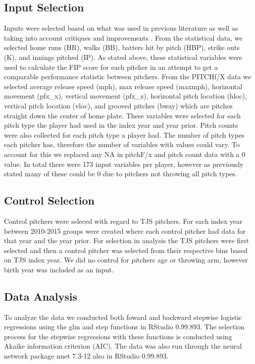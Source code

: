 \subsection{Input Selection}

Inputs were selected based on what was used in previous literature as well as taking into account critiques and improvements \cite{Gray2014}. From the statistical data, we selected home runs (HR), walks (BB), batters hit by pitch (HBP), strike outs (K), and innings pitched (IP). As stated above, these statistical variables were used to calculate the FIP score for each pitcher in an attempt to get a comparable performance statistic between pitchers. From the PITCHf/X data we selected average release speed (mph), max release speed (maxmph), horizontal movement (pfx\_x), vertical movement (pfx\_z), horizontal pitch location (hloc), vertical pitch location (vloc), and grooved pitches (bway) which are pitches straight down the center of home plate. These variables were selected for each pitch type the player had used in the index year and year prior. Pitch counts were also collected for each pitch type a player had. The number of pitch types each pitcher has, therefore the number of variables with values could vary. To account for this we replaced any NA in pitchF/x and pitch count data with a 0 value. In total there were 173 input variables per player, however as previously stated many of these could be 0 due to pitchers not throwing all pitch types.

\subsection{Control Selection}

Control pitchers were seleced with regard to TJS pitchers. For each index year between 2010-2015 groups were created where each control pitcher had data for that year and the year prior. For selection in analysis the TJS pitchers were first selected and then a control pitcher was selected from their respective bins based on TJS index year. We did no control for pitchers age or throwing arm, however birth year was included as an input.

\subsection{Data Analysis}
To analyze the data we conducted both foward and backward stepwise logistic regressions using the glm and step functions in RStudio 0.99.893. The selection process for the stepwise regressions with these functions is conducted using Akaike information criterion (AIC). The data was also run through the neural network package nnet 7.3-12 also in RStudio 0.99.893.




